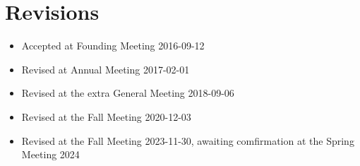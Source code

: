 \section*{Revisions}

\begin{itemize}
  \item Accepted at Founding Meeting 2016-09-12
  \item Revised at Annual Meeting 2017-02-01
  \item Revised at the extra General Meeting 2018-09-06  
  \item Revised at the Fall Meeting 2020-12-03
  \item Revised at the Fall Meeting 2023-11-30, awaiting comfirmation at the Spring Meeting 2024 
\end{itemize}
